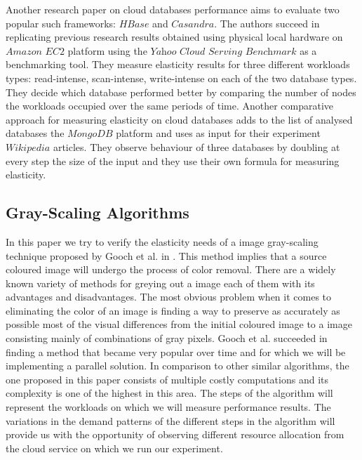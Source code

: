 \documentclass[conference]{IEEEtran}
\begin{document}
Another research paper on cloud databases performance \cite{kuhlenkamp2014benchmarking} aims to evaluate two popular such frameworks: $\textit{HBase}$ and $\textit{Casandra}$. The authors succeed in replicating previous research results obtained using physical local hardware on $\textit{Amazon EC2}$ platform using the $\textit{Yahoo Cloud Serving Benchmark}$ as a benchmarking tool. They measure elasticity results for three different workloads types: read-intense, scan-intense, write-intense on each of the two database types. They decide which database performed better by comparing the number of nodes the workloads occupied over the same periods of time. 
Another comparative approach for measuring elasticity on cloud databases \cite{dory2011comparative} adds to the list of analysed databases the $\textit{MongoDB}$ platform and uses as input for their experiment $\textit{Wikipedia}$ articles. They observe behaviour of three databases by doubling at every step the size of the input and they use their own formula for measuring elasticity.

\subsection{Gray-Scaling Algorithms}
In this paper we try to verify the elasticity needs of a image gray-scaling technique proposed by Gooch et al. in \cite{gooch2005color2gray}. This method implies that a source coloured image will undergo the process of color removal. There are a widely known variety of methods for greying out a image each of them with its advantages and disadvantages. The most obvious problem when it comes to eliminating the color of an image is finding a way to preserve as accurately as possible most of the visual differences from the initial coloured image to a image consisting mainly of combinations of gray pixels. Gooch et al. \cite{gooch2005color2gray} succeeded in finding a method that became very popular over time and for which we will be implementing a parallel solution. In comparison to other similar algorithms, the one proposed in this paper consists of multiple costly computations and its complexity is one of the highest in this area. The steps of the algorithm will represent the workloads on which we will measure performance results. The variations in the demand patterns of the different steps in the algorithm will provide us with the opportunity of observing different resource allocation from the cloud service on which we run our experiment.\\
\end{document}

